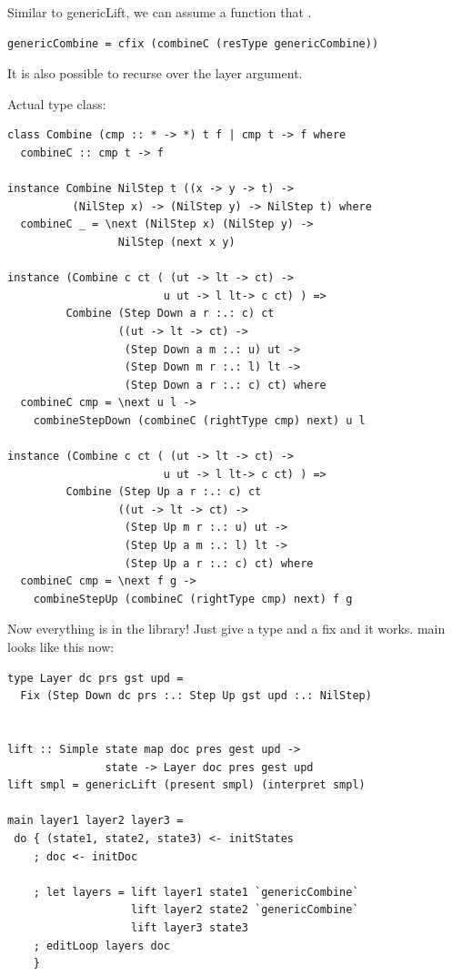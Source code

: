 \documentclass[preprint,natbib]{sigplanconf}
\begin{document}
Similar to genericLift, we can assume a function that .


\begin{small}
\begin{verbatim}
genericCombine = cfix (combineC (resType genericCombine))
\end{verbatim}%
\end{small}

It is also possible to recurse over the layer argument.


Actual type class:
\begin{small}
\begin{verbatim}
class Combine (cmp :: * -> *) t f | cmp t -> f where
  combineC :: cmp t -> f

instance Combine NilStep t ((x -> y -> t) -> 
          (NilStep x) -> (NilStep y) -> NilStep t) where
  combineC _ = \next (NilStep x) (NilStep y) ->
                 NilStep (next x y) 
 
instance (Combine c ct ( (ut -> lt -> ct) ->
                        u ut -> l lt-> c ct) ) =>
         Combine (Step Down a r :.: c) ct
                 ((ut -> lt -> ct) ->
                  (Step Down a m :.: u) ut -> 
                  (Step Down m r :.: l) lt -> 
                  (Step Down a r :.: c) ct) where
  combineC cmp = \next u l ->
    combineStepDown (combineC (rightType cmp) next) u l

instance (Combine c ct ( (ut -> lt -> ct) ->
                        u ut -> l lt-> c ct) ) =>
         Combine (Step Up a r :.: c) ct
                 ((ut -> lt -> ct) -> 
                  (Step Up m r :.: u) ut -> 
                  (Step Up a m :.: l) lt -> 
                  (Step Up a r :.: c) ct) where
  combineC cmp = \next f g ->
    combineStepUp (combineC (rightType cmp) next) f g
\end{verbatim}
\end{small}





Now everything is in the library! Just give a type and a fix and it works. main looks like this now:
\begin{small}
\begin{verbatim}
type Layer dc prs gst upd = 
  Fix (Step Down dc prs :.: Step Up gst upd :.: NilStep)

                
lift :: Simple state map doc pres gest upd ->
               state -> Layer doc pres gest upd
lift smpl = genericLift (present smpl) (interpret smpl)

main layer1 layer2 layer3 =
 do { (state1, state2, state3) <- initStates
    ; doc <- initDoc 

    ; let layers = lift layer1 state1 `genericCombine` 
                   lift layer2 state2 `genericCombine`
                   lift layer3 state3
    ; editLoop layers doc
    }
\end{verbatim}
\end{small}
\end{document}

